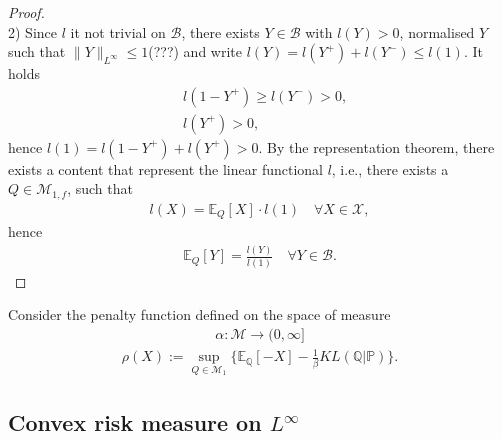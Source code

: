 \begin{proof}
\quad\\
2) Since $l$ it not trivial on $\mathcal{B}$, there exists $Y \in \mathcal{B}$ with $l(Y) > 0$, normalised $Y$ such that $\|Y\|_{L^\infty} \le 1$(???) and write $l(Y) = l(Y^+) + l(Y^-) \le l(1) $. It holds
\begin{align*}
	& l(1 - Y^+) \ge l(Y^-) > 0, \\
	& l(Y^+) > 0,	
\end{align*}
hence $l(1) = l(1 - Y^+) + l(Y^+) > 0$. By the representation theorem, there exists a content that represent the linear functional $l$, i.e., there exists a $Q \in \mathcal{M}_{1, f}$, such that
\begin{align*}
	l(X) = \mathbb{E}_Q[X] \cdot l(1) \quad \forall X \in \mathcal{X}, 
\end{align*} 
hence
\begin{align*}
	\mathbb{E}_Q  [Y] = \frac{l(Y)}{l(1)} \quad \forall Y \in \mathcal{B}. 
\end{align*}
\end{proof}




\begin{example}
Consider the penalty function defined on the space of measure
\begin{align*}
	\alpha: \mathcal{M} \rightarrow (0, \infty]
\end{align*}
\begin{align*}
	\rho(X):= \sup_{Q \in \mathcal{M}_1} \bigg\{ \mathbb{E}_{\mathbb{Q}} [-X] - \frac{1}{\beta} KL(\mathbb{Q}|\mathbb{P}) \bigg\}.
\end{align*}
\end{example}

\begin{example}
	
\end{example}

\subsection{\texorpdfstring{Convex risk measure on $L^\infty$}{Convex risk measure on L-infinity}}

